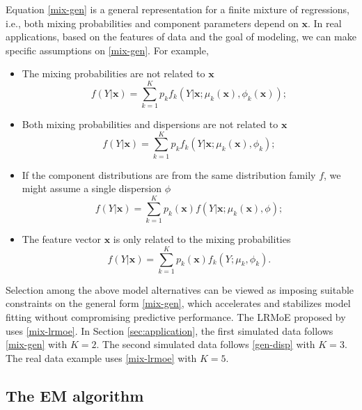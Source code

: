 \documentclass[11pt]{article}
\numberwithin{equation}{section}
\def\bx{\boldsymbol{x}}
\begin{document}
	Equation \eqref{mix-gen} is a general representation for a finite mixture of regressions, 
	i.e., both mixing probabilities and component parameters depend on $\bx$.
	In real applications,  based on the features of data and the goal of modeling, we can make specific assumptions on \eqref{mix-gen}. For example,
	\begin{itemize}
		\item The mixing probabilities are not related to $\bx$
		\begin{equation*}
			f(Y|\bx)=\sum_{k=1}^Kp_kf_k(Y|\bx;\mu_k(\bx),\phi_k(\bx));
		\end{equation*}
		\item Both mixing probabilities and dispersions are not related to $\bx$
		\begin{equation*}
f(Y|\bx)=\sum_{k=1}^Kp_kf_k(Y|\bx;\mu_k(\bx),\phi_k);
		\end{equation*}

		\item If the component distributions are from the same distribution family $f$, we might assume a single dispersion $\phi$ 
\begin{equation}\label{gen-disp}
f(Y|\bx)=\sum_{k=1}^Kp_k(\bx)f(Y|\bx;\mu_k(\bx),\phi);
\end{equation}
		\item The feature vector $\bx$ is only related to the mixing probabilities
\begin{equation}\label{mix-lrmoe}
	f(Y|\bx)=\sum_{k=1}^Kp_k(\bx)f_k(Y;\mu_k,\phi_k).
\end{equation}
	\end{itemize}
	Selection among the above model alternatives can be viewed as imposing suitable constraints on the general form \eqref{mix-gen}, 
	which accelerates and stabilizes model fitting without compromising predictive performance. 
	The LRMoE proposed by \citet{fung2019class} uses \eqref{mix-lrmoe}.
	In Section \ref{sec:application}, the first simulated data follows \eqref{mix-gen} with $K=2$. The second simulated data follows \eqref{gen-disp} with $K=3$. The real data example uses \eqref{mix-lrmoe} with $K=5$.

\subsection{The EM algorithm}\label{sec:EM}
\end{document}

